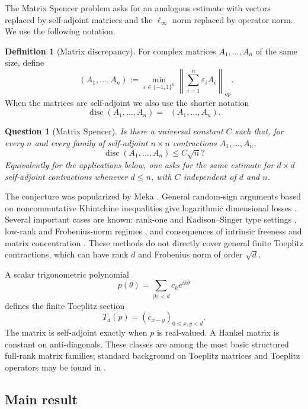 \documentclass[11pt]{amsart}
\newtheorem{question}[theorem]{Question}
\theoremstyle{definition}
\newtheorem{definition}[theorem]{Definition}
\DeclareMathOperator{\disc}{disc}
\DeclareMathOperator{\discop}{disc_{op}}
\newcommand{\eps}{\varepsilon}
\begin{document}
The Matrix Spencer problem asks for an analogous estimate with vectors replaced
by self-adjoint matrices and the $\ell_\infty$ norm replaced by operator norm.
We use the following notation.

\begin{definition}[Matrix discrepancy]
For complex matrices $A_1,\ldots,A_n$ of the same size, define
\[
   \discop(A_1,\ldots,A_n)
   := \min_{\eps\in\{-1,1\}^n}
      \left\|\sum_{i=1}^n \eps_i A_i\right\|_{op} .
\]
When the matrices are self-adjoint we also use the shorter notation
\[
   \disc(A_1,\ldots,A_n)=\discop(A_1,\ldots,A_n).
\]
\end{definition}

\begin{question}[Matrix Spencer]
Is there a universal constant $C$ such that, for every $n$ and every family of
self-adjoint $n\times n$ contractions $A_1,\ldots,A_n$,
\[
   \disc(A_1,\ldots,A_n)\le C\sqrt n ?
\]
Equivalently for the applications below, one asks for the same estimate for
$d\times d$ self-adjoint contractions whenever $d\le n$, with $C$ independent of
$d$ and $n$.
\end{question}

The conjecture was popularized by Meka \cite{Meka2014}.  General random-sign
arguments based on noncommutative Khintchine inequalities give logarithmic
dimensional losses \cite{LustPiquardPisier1991}.  Several important cases are
known: rank-one and Kadison--Singer type settings
\cite{MSS2015,KyngLuhSong2020}, low-rank and Frobenius-norm regimes
\cite{BansalJiangMeka2024,DadushJiangReis2022}, and consequences of intrinsic
freeness and matrix concentration \cite{BBvH2023,BCSvH2026}.  These methods do
not directly cover general finite Toeplitz contractions, which can have rank
$d$ and Frobenius norm of order $\sqrt d$.

A scalar trigonometric polynomial
\[
   p(\theta)=\sum_{|k|<d} c_k e^{ik\theta}
\]
defines the finite Toeplitz section
\[
   T_d(p)=(c_{x-y})_{0\le x,y<d} .
\]
The matrix is self-adjoint exactly when $p$ is real-valued.  A Hankel matrix is
constant on anti-diagonals.  These classes are among the most basic structured
full-rank matrix families; standard background on Toeplitz matrices and
Toeplitz operators may be found in \cite{GrenanderSzego1958,Gray2006,BoettcherGrudsky2005,BoettcherSilbermann2006}.

\subsection{Main result}
\end{document}
